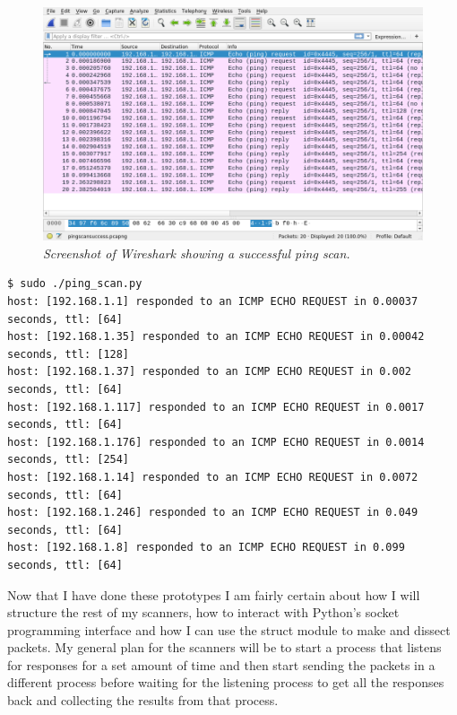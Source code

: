\documentclass[titlepage]{article}
\begin{document}
\begin{figure}[H]
  \centering
  \includegraphics[width=\textwidth]{pingscan.png}
  \caption{\textit{%
    Screenshot of Wireshark showing a successful ping scan.
}}\label{pingscansuccess}
\end{figure}

\lstset{language=C}
\begin{lstlisting}[label=pingscanout,caption=\textit{The output of from the ping scanner on the run which generated the \gls{pcap} file in figure~\ref{pingscansuccess}}]
$ sudo ./ping_scan.py
host: [192.168.1.1]	responded to an ICMP ECHO REQUEST in 0.00037    seconds, ttl: [64]
host: [192.168.1.35] responded to an ICMP ECHO REQUEST in 0.00042    seconds, ttl: [128]
host: [192.168.1.37] responded to an ICMP ECHO REQUEST in 0.002      seconds, ttl: [64]
host: [192.168.1.117] responded to an ICMP ECHO REQUEST in 0.0017     seconds, ttl: [64]
host: [192.168.1.176] responded to an ICMP ECHO REQUEST in 0.0014     seconds, ttl: [254]
host: [192.168.1.14] responded to an ICMP ECHO REQUEST in 0.0072     seconds, ttl: [64]
host: [192.168.1.246] responded to an ICMP ECHO REQUEST in 0.049      seconds, ttl: [64]
host: [192.168.1.8] responded to an ICMP ECHO REQUEST in 0.099      seconds, ttl: [64]
\end{lstlisting}

Now that I have done these prototypes I am fairly certain about how I will structure the rest of
my scanners, how to interact with Python's socket programming interface and how I can use the
struct module to make and dissect packets. My general plan for the scanners will be to start
a process that listens for responses for a set amount of time and then start sending the packets
in a different process before waiting for the listening process to get all the responses back and
collecting the results from that process.
\end{document}
